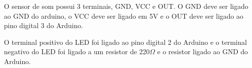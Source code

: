 \documentclass[12pt]{article}
\begin{document}
O sensor de som possui 3 terminais, GND, VCC e OUT. O GND deve ser ligado ao GND do arduino, o VCC deve ser ligado em 5V e o OUT deve ser ligado ao pino digital 3 do Arduino.

O terminal positivo do LED foi ligado ao pino digital 2 do Arduino e o terminal negativo do LED foi ligado a um resistor de 220$\Omega$ e o resistor ligado ao GND do Arduino.



\end{document}
